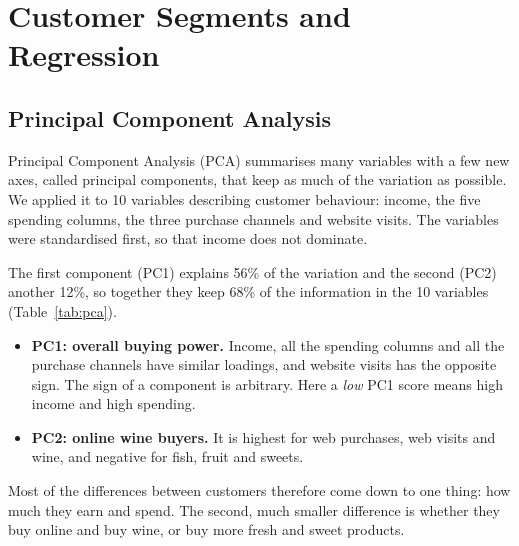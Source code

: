 \documentclass[11pt,a4paper]{article}
\begin{document}
\section{Customer Segments and Regression}

\subsection{Principal Component Analysis}
Principal Component Analysis (PCA) summarises many variables with a few new axes, called principal components, that keep as much of the variation as possible. We applied it to 10 variables describing customer behaviour: income, the five spending columns, the three purchase channels and website visits. The variables were standardised first, so that income does not dominate.

The first component (PC1) explains 56\% of the variation and the second (PC2) another 12\%, so together they keep 68\% of the information in the 10 variables (Table~\ref{tab:pca}).
\begin{itemize}
	\item \textbf{PC1: overall buying power.} Income, all the spending columns and all the purchase channels have similar loadings, and website visits has the opposite sign. The sign of a component is arbitrary. Here a \emph{low} PC1 score means high income and high spending.
	\item \textbf{PC2: online wine buyers.} It is highest for web purchases, web visits and wine, and negative for fish, fruit and sweets.
\end{itemize}
Most of the differences between customers therefore come down to one thing: how much they earn and spend. The second, much smaller difference is whether they buy online and buy wine, or buy more fresh and sweet products.
\end{document}
